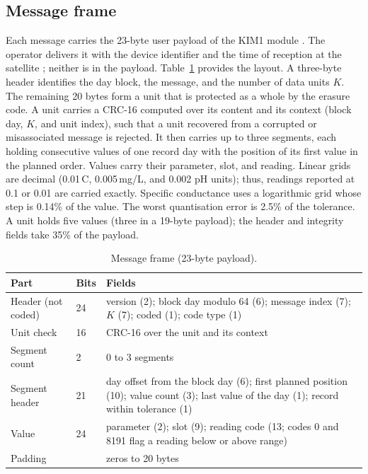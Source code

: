 \subsection{Message frame}
\label{sec:frame}
Each message carries the 23-byte user payload of the KIM1 module \citep{kineis2023kim1}. The operator delivers it with the device identifier and the time of reception at the satellite \citep{kineis2024formats}; neither is in the payload. Table~\ref{tab:frame} provides the layout. A three-byte header identifies the day block, the message, and the number of data units $K$. The remaining 20 bytes form a unit that is protected as a whole by the erasure code. A unit carries a CRC-16 computed over its content and its context (block day, $K$, and unit index), such that a unit recovered from a corrupted or misassociated message is rejected. It then carries up to three segments, each holding consecutive values of one record day with the position of its first value in the planned order. Values carry their parameter, slot, and reading. Linear grids are decimal (0.01\,\textdegree C, 0.005\,mg/L, and 0.002 pH units); thus, readings reported at 0.1 or 0.01 are carried exactly. Specific conductance uses a logarithmic grid whose step is 0.14\% of the value. The worst quantisation error is 2.5\% of the tolerance. A unit holds five values (three in a 19-byte payload); the header and integrity fields take 35\% of the payload.

\begin{table}[t]
\centering
\caption{Message frame (23-byte payload).}
\label{tab:frame}
\small
\begin{tabularx}{\textwidth}{@{}llX@{}}
\toprule
Part & Bits & Fields \\
\midrule
Header (not coded) & 24 & version (2); block day modulo 64 (6); message index (7); $K$ (7); coded (1); code type (1) \\
Unit check & 16 & CRC-16 over the unit and its context \\
Segment count & 2 & 0 to 3 segments \\
Segment header & 21 & day offset from the block day (6); first planned position (10); value count (3); last value of the day (1); record within tolerance (1) \\
Value & 24 & parameter (2); slot (9); reading code (13; codes 0 and 8191 flag a reading below or above range) \\
Padding & & zeros to 20 bytes \\
\bottomrule
\end{tabularx}
\end{table}

